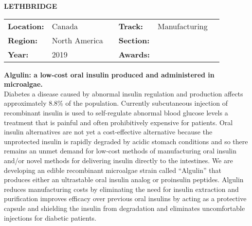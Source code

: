 \textbf{\uppercase{Lethbridge}} \FloatBarrier \begin{table}[h] \begin{tabular}{lp{2.5cm}llll} \textbf{Location:} & Canada & \multicolumn{1}{|l}{} & \textbf{Track:}   & Manufacturing \\ \textbf{Region:}   & North America   & \multicolumn{1}{|l}{} & \textbf{Section:} &  \\ \textbf{Year:}     & 2019   & \multicolumn{1}{|l}{} & \textbf{Awards:}  & \end{tabular} \end{table} \FloatBarrier \noindent\textbf{Algulin: a low-cost oral insulin produced and administered in microalgae.} \vspace{.2cm}\\ 
Diabetes a disease caused by abnormal insulin regulation and production affects approximately 8.8\% of the population. Currently subcutaneous injection of recombinant insulin is used to self-regulate abnormal blood glucose levels a treatment that is painful and often prohibitively expensive for patients. Oral insulin alternatives are not yet a cost-effective alternative because the unprotected insulin is rapidly degraded by acidic stomach conditions and so there remains an unmet demand for low-cost methods of manufacturing oral insulin and/or novel methods for delivering insulin directly to the intestines. We are developing an edible recombinant microalgae strain called “Algulin” that produces either an ultrastable oral insulin analog or proinsulin peptides. Algulin reduces manufacturing costs by eliminating the need for insulin extraction and purification improves efficacy over previous oral insulins by acting as a protective capsule and shielding the insulin from degradation and eliminates uncomfortable injections for diabetic patients. 
\vspace{2cm}

